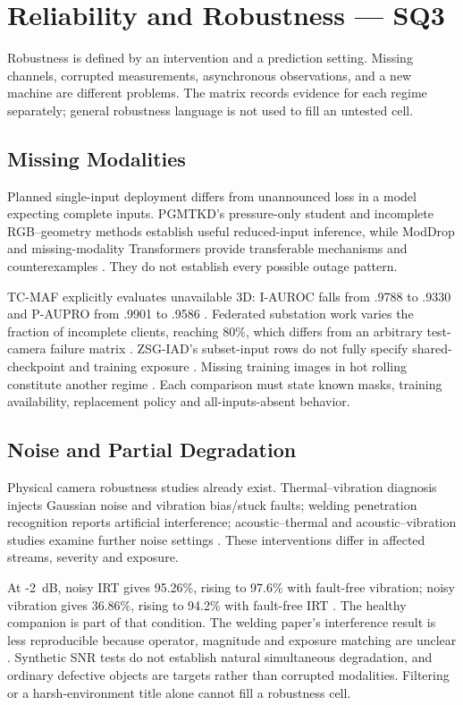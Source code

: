 \section{Reliability and Robustness --- SQ3}

Robustness is defined by an intervention and a prediction setting. Missing channels, corrupted measurements, asynchronous observations, and a new machine are different problems. The matrix records evidence for each regime separately; general robustness language is not used to fill an untested cell.

\subsection{Missing Modalities}
Planned single-input deployment differs from unannounced loss in a model expecting complete inputs. PGMTKD's pressure-only student and incomplete RGB--geometry methods establish useful reduced-input inference, while ModDrop and missing-modality Transformers provide transferable mechanisms and counterexamples \citep{Li2025PGMTKD,Sui2026Incomplete,P005,P016}. They do not establish every possible outage pattern.

TC-MAF explicitly evaluates unavailable 3D: I-AUROC falls from .9788 to .9330 and P-AUPRO from .9901 to .9586 \citep[PDF p.~7, Table~3]{P026}. Federated substation work varies the fraction of incomplete clients, reaching 80\%, which differs from an arbitrary test-camera failure matrix \citep[PDF p.~29, Figure~8]{P051}. ZSG-IAD's subset-input rows do not fully specify shared-checkpoint and training exposure \citep{P025}. Missing training images in hot rolling constitute another regime \citep{Ma2025A}. Each comparison must state known masks, training availability, replacement policy and all-inputs-absent behavior.

\subsection{Noise and Partial Degradation}
Physical camera robustness studies already exist. Thermal--vibration diagnosis injects Gaussian noise and vibration bias/stuck faults; welding penetration recognition reports artificial interference; acoustic--thermal and acoustic--vibration studies examine further noise settings \citep{Huo2022Multisensor,Hua2026Weld,Ying2025Trustworthy,Huang2026Rolling}. These interventions differ in affected streams, severity and exposure.

At -2~dB, noisy IRT gives 95.26\%, rising to 97.6\% with fault-free vibration; noisy vibration gives 36.86\%, rising to 94.2\% with fault-free IRT \citep[PDF p.~7, Table~VIII]{Huo2022Multisensor}. The healthy companion is part of that condition. The welding paper's interference result is less reproducible because operator, magnitude and exposure matching are unclear \citep{Hua2026Weld}. Synthetic SNR tests do not establish natural simultaneous degradation, and ordinary defective objects are targets rather than corrupted modalities. Filtering or a harsh-environment title alone cannot fill a robustness cell.

